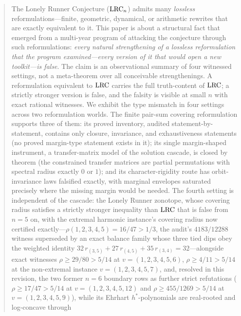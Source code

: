 
\begin{abstract}
\noindent
The Lonely Runner Conjecture ($\lrc_n$) admits many \emph{lossless}
reformulations---finite, geometric, dynamical, or arithmetic rewrites that
are exactly equivalent to it. This paper is about a structural fact that
emerged from a multi-year program of attacking the conjecture through such
reformulations: \emph{every natural strengthening of a lossless
reformulation that the program examined---every version of it that would
open a new toolkit---is false}. The claim is an observational summary of
four witnessed settings, not a meta-theorem over all conceivable
strengthenings. A reformulation equivalent to $\lrc$ carries the full
truth-content of $\lrc$; a strictly stronger version is false, and the
falsity is visible at small $n$ with exact rational witnesses. We exhibit
the type mismatch in four settings across two reformulation worlds. The
finite pair-sum covering reformulation supports three of them: its proved
inventory, audited statement-by-statement, contains only closure,
invariance, and exhaustiveness statements (no proved margin-type statement
exists in it); its single margin-shaped instrument, a transfer-matrix
model of the solution cascade, is closed by theorem (the constrained
transfer matrices are partial permutations with spectral radius exactly
$0$ or $1$); and its character-rigidity route has orbit-invariance laws
falsified exactly, with marginal envelopes saturated precisely where the
missing margin would be needed. The fourth setting is independent of the
cascade: the Lonely Runner zonotope, whose covering radius satisfies a
strictly stronger inequality than $\lrc$ that is false from $n=5$ on,
with the extremal harmonic instance's covering radius now certified
exactly---$\rho(1,2,3,4,5)=16/47>1/3$, the audit's $4183/12288$ witness
superseded by an exact balance family whose three tied dips obey the
weighted identity $32\,r_{(3,5)}+27\,r_{(4,5)}+35\,r_{(3,4)}=32$---alongside
exact witnesses $\rho \ge 29/80 > 5/14$ at $v=(1,2,3,4,5,6)$, $\rho \ge
4/11 > 5/14$ at the non-extremal instance $v=(1,2,3,4,5,7)$, and, resolved
in this revision, the two former $n=6$ boundary rows as further strict
refutations ($\rho\ge17/47>5/14$ at $v=(1,2,3,4,5,12)$ and
$\rho\ge455/1269>5/14$ at $v=(1,2,3,4,5,9)$), while its
Ehrhart $h^*$-polynomials are real-rooted and log-concave through

\end{abstract}
